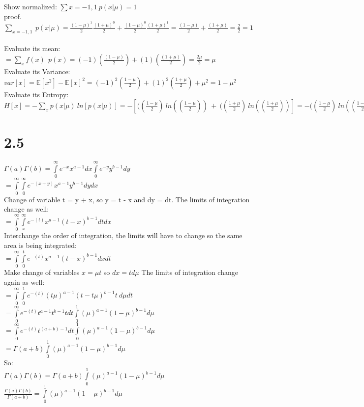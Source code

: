 \documentclass[11pt,leqno,fleqn]{article}
\begin{document}
 Show normalized: $\sum\limits{x = -1,1} \ p(x| \mu) = 1$\\
 proof.\\
 $\sum\limits_{x = -1,1} \ p(x| \mu) = \frac{(1- \mu)^1}{2}\frac{ (1+ \mu)^0}{2} + \frac{(1- \mu)^0}{2}\frac{ (1+ \mu)^1}{2} =  \frac{(1- \mu)}{2} +  \frac{(1 + \mu)}{2} = \frac{2}{2} = 1 $\\
\\
Evaluate its mean:\\
 $ =  \sum\limits_{x} f(x) \ \  p(x) = (-1)(\frac{(1- \mu)}{2}) + (1)(\frac{(1+ \mu)}{2}) = \frac{2 \mu}{2} = \mu$
\\
Evaluate its Variance:\\
$var[x] = \mathbb{E}[x^2] - \mathbb{E}[x]^2 = (-1)^2(\frac{1- \mu}{2}) + (1)^2(\frac{1 + \mu}{2}) + \mu ^2 = 1 - \mu ^2$\\
Evaluate its Entropy:\\
$H[x] =  - \sum\limits_{x} p(x | \mu)  \ ln[p(x | \mu)]  = - [  ((\frac{1- \mu}{2}) \ ln( (\frac{1- \mu}{2})) \ + \   ((\frac{1+ \mu}{2}) \ ln( (\frac{1+ \mu}{2}))] = -  ((\frac{1- \mu}{2}) \ ln( (\frac{1- \mu}{2})) \ - \   ((\frac{1+ \mu}{2}) \ ln( (\frac{1+ \mu}{2})) $

\section{2.5}
$\Gamma (a) \Gamma(b) =  \int\limits_0^\infty e^{-x} x^{a-1} dx \int\limits_0^\infty e^{-y}y^{b-1}dy$\\
$= \int\limits_0^\infty  \int\limits_0^\infty  e^{-(x+y)} x^{a-1} y^{b-1} dydx$\\
Change of variable t = y + x, so y = t - x and dy = dt. The limits of integration change as well:\\
$= \int\limits_0^\infty  \int\limits_x^\infty  e^{-(t)} x^{a-1} (t-x)^{b-1} dtdx$\\
Interchange the order of integration, the limits will have to change so the same area is being integrated:\\
$= \int\limits_0^\infty  \int\limits_0^t  e^{-(t)} x^{a-1} (t-x)^{b-1} dxdt$\\
Make change of variables $x = \mu t $ so $dx = t d\mu$ The limits of integration change again as well:\\
$= \int\limits_0^\infty  \int\limits_0^1  e^{-(t)} (t \mu)^{a-1} (t- t \mu)^{b-1} t \ d\mu dt$\\
$= \int\limits_0^\infty e^{-(t)}  t^{a-1} t^{b-1} t dt \int\limits_0^1   ( \mu)^{a-1} (1-  \mu)^{b-1} d\mu  $\\
$= \int\limits_0^\infty e^{-(t)}  t^{(a+b) - 1} dt \int\limits_0^1   ( \mu)^{a-1} (1-  \mu)^{b-1} d\mu  $\\
$= \Gamma(a+b) \int\limits_0^1   ( \mu)^{a-1} (1-  \mu)^{b-1} d\mu  $\\
So:\\
$\Gamma (a) \Gamma(b) = \Gamma(a+b) \int\limits_0^1   ( \mu)^{a-1} (1-  \mu)^{b-1} d\mu  $\\
$\frac{\Gamma (a) \Gamma(b)}{ \Gamma(a+b)} =  \int\limits_0^1   ( \mu)^{a-1} (1-  \mu)^{b-1} d\mu$
\end{document}
